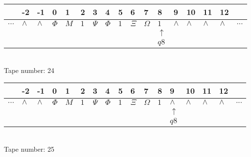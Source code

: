 \documentclass{article}
\begin{document}
\begin{table}[H]
\centering
\begin{tabular}{lllllllllllllllll}
 & -2 & -1 & 0 & 1 & 2 & 3 & 4 & 5 & 6 & 7 & 8 & 9 & 10 & 11 & 12 & \\
\hline
$...$ & \multicolumn{1}{|l|}{$\wedge$} & \multicolumn{1}{|l|}{$\wedge$} & \multicolumn{1}{|l|}{$\Phi$} & \multicolumn{1}{|l|}{$M$} & \multicolumn{1}{|l|}{$1$} & \multicolumn{1}{|l|}{$\Psi$} & \multicolumn{1}{|l|}{$\Phi$} & \multicolumn{1}{|l|}{$1$} & \multicolumn{1}{|l|}{$\Xi$} & \multicolumn{1}{|l|}{$\Omega$} & \multicolumn{1}{|l|}{$1$} & \multicolumn{1}{|l|}{$\wedge$} & \multicolumn{1}{|l|}{$\wedge$} & \multicolumn{1}{|l|}{$\wedge$} & \multicolumn{1}{|l|}{$\wedge$} & $...$\\
\hline
&  &  &  &  &  &  &  &  &  &  & $\uparrow$ &  &  &  &  &  \\
&  &  &  &  &  &  &  &  &  &  & $ q8 $ &  &  &  &  &  \\
\end{tabular}
\\
Tape number: 24
\noindent\makebox[\linewidth]{\hdashrule{\textwidth}{1pt}{1pt}}\end{table}

\begin{table}[H]
\centering
\begin{tabular}{lllllllllllllllll}
 & -2 & -1 & 0 & 1 & 2 & 3 & 4 & 5 & 6 & 7 & 8 & 9 & 10 & 11 & 12 & \\
\hline
$...$ & \multicolumn{1}{|l|}{$\wedge$} & \multicolumn{1}{|l|}{$\wedge$} & \multicolumn{1}{|l|}{$\Phi$} & \multicolumn{1}{|l|}{$M$} & \multicolumn{1}{|l|}{$1$} & \multicolumn{1}{|l|}{$\Psi$} & \multicolumn{1}{|l|}{$\Phi$} & \multicolumn{1}{|l|}{$1$} & \multicolumn{1}{|l|}{$\Xi$} & \multicolumn{1}{|l|}{$\Omega$} & \multicolumn{1}{|l|}{$1$} & \multicolumn{1}{|l|}{$\wedge$} & \multicolumn{1}{|l|}{$\wedge$} & \multicolumn{1}{|l|}{$\wedge$} & \multicolumn{1}{|l|}{$\wedge$} & $...$\\
\hline
&  &  &  &  &  &  &  &  &  &  &  & $\uparrow$ &  &  &  &  \\
&  &  &  &  &  &  &  &  &  &  &  & $ q8 $ &  &  &  &  \\
\end{tabular}
\\
Tape number: 25
\noindent\makebox[\linewidth]{\hdashrule{\textwidth}{1pt}{1pt}}\end{table}
\end{document}
